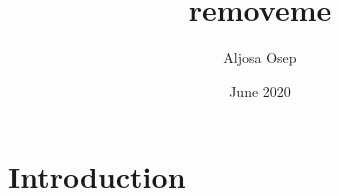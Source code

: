 \documentclass{article}
\title{removeme}
\author{Aljosa Osep}
\date{June 2020}
\begin{document}
\maketitle

\section{Introduction}


\cite{xu19cvpr}
\cite{stemseg_arxiv20}
\cite{Gross193DV}
\cite{Voigtlaender19CVPR_MOTS}
\cite{Osep20ICRA}
\cite{Osep19ICRA}
\cite{Osep18ICRA}
\cite{Osep17ICRA}
\cite{Klostermann16BMVC}
\cite{Kochanov16IROS}
\cite{Osep16ICRA}
\cite{Mitzel15ICRA}
\cite{Weinmann13ICCV}
\cite{Weinmann12BMVC}



\end{document}
